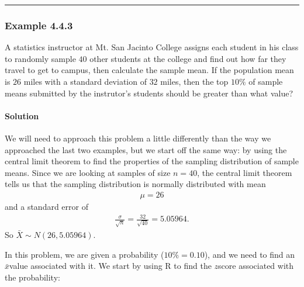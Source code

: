 \documentclass[letterpaper,10pt,english]{jupyterBook}
\begin{document}
\bigskip\hrule\bigskip



\subsubsection{Example 4.4.3}
\label{\detokenize{Ch4 The Normal Distribution and the Central Limit Theorem/4.4 The Central Limit Theorem for Means:example-4-4-3}}
\sphinxAtStartPar
A statistics instructor at Mt. San Jacinto College assigns each student in his class to randomly sample \(40\) other students at the college and find out how far they travel to get to campus, then calculate the sample mean. If the population mean is \(26\) miles with a standard deviation of \(32\) miles, then the top \(10\%\) of sample means submitted by the instrutor’s students should be greater than what value?


\paragraph{Solution}
\label{\detokenize{Ch4 The Normal Distribution and the Central Limit Theorem/4.4 The Central Limit Theorem for Means:id2}}
\sphinxAtStartPar
We will need to approach this problem a little differently than the way we approached the last two examples, but we start off the same way: by using the central limit theorem to find the properties of the sampling distribution of sample means. Since we are looking at samples of size \(n = 40\), the central limit theorem tells us that the sampling distribution is normally distributed with mean
\begin{equation*}
\begin{split} \mu = 26 \end{split}
\end{equation*}
\sphinxAtStartPar
and a standard error of
\begin{equation*}
\begin{split} \frac{\sigma}{\sqrt{n}} = \frac{32}{\sqrt{40}} = 5.05964. \end{split}
\end{equation*}
\sphinxAtStartPar
So \(\bar{X} \sim N(26, 5.05964)\).

\sphinxAtStartPar
In this problem, we are given a probability (\(10\% = 0.10\)), and we need to find an \(\bar{x}\)\sphinxhyphen{}value associated with it. We start by using R to find the \(z\)\sphinxhyphen{}score associated with the probability:
\end{document}
